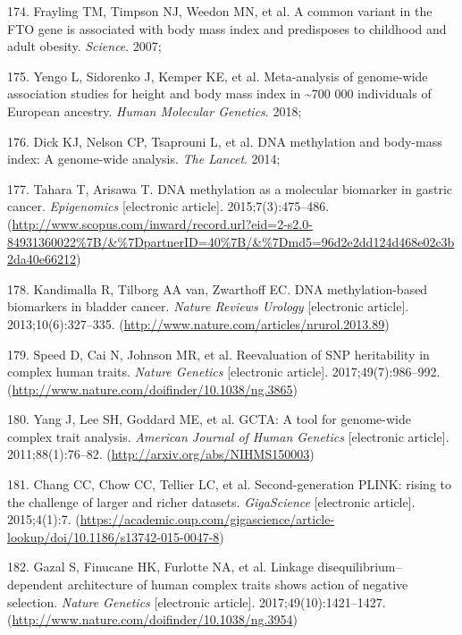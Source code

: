 \documentclass[11pt,oneside]{bristolthesis}
\newenvironment{cslreferences}%
  {}%
  {\par}
\begin{document}
\begin{cslreferences}
\leavevmode\hypertarget{ref-Frayling2007}{}%
174. Frayling TM, Timpson NJ, Weedon MN, et al. A common variant in the FTO gene is associated with body mass index and predisposes to childhood and adult obesity. \emph{Science}. 2007;

\leavevmode\hypertarget{ref-Yengo2018}{}%
175. Yengo L, Sidorenko J, Kemper KE, et al. Meta-analysis of genome-wide association studies for height and body mass index in \textasciitilde700 000 individuals of European ancestry. \emph{Human Molecular Genetics}. 2018;

\leavevmode\hypertarget{ref-Dick2014}{}%
176. Dick KJ, Nelson CP, Tsaprouni L, et al. DNA methylation and body-mass index: A genome-wide analysis. \emph{The Lancet}. 2014;

\leavevmode\hypertarget{ref-Tahara2015}{}%
177. Tahara T, Arisawa T. DNA methylation as a molecular biomarker in gastric cancer. \emph{Epigenomics} {[}electronic article{]}. 2015;7(3):475--486. (\url{http://www.scopus.com/inward/record.url?eid=2-s2.0-84931360022\%7B/\&\%7DpartnerID=40\%7B/\&\%7Dmd5=96d2e2dd124d468e02c3b2da40e66212})

\leavevmode\hypertarget{ref-Kandimalla2013}{}%
178. Kandimalla R, Tilborg AA van, Zwarthoff EC. DNA methylation-based biomarkers in bladder cancer. \emph{Nature Reviews Urology} {[}electronic article{]}. 2013;10(6):327--335. (\url{http://www.nature.com/articles/nrurol.2013.89})

\leavevmode\hypertarget{ref-Speed2017}{}%
179. Speed D, Cai N, Johnson MR, et al. Reevaluation of SNP heritability in complex human traits. \emph{Nature Genetics} {[}electronic article{]}. 2017;49(7):986--992. (\url{http://www.nature.com/doifinder/10.1038/ng.3865})

\leavevmode\hypertarget{ref-Yang2011}{}%
180. Yang J, Lee SH, Goddard ME, et al. GCTA: A tool for genome-wide complex trait analysis. \emph{American Journal of Human Genetics} {[}electronic article{]}. 2011;88(1):76--82. (\url{http://arxiv.org/abs/NIHMS150003})

\leavevmode\hypertarget{ref-Chang2015}{}%
181. Chang CC, Chow CC, Tellier LC, et al. Second-generation PLINK: rising to the challenge of larger and richer datasets. \emph{GigaScience} {[}electronic article{]}. 2015;4(1):7. (\url{https://academic.oup.com/gigascience/article-lookup/doi/10.1186/s13742-015-0047-8})

\leavevmode\hypertarget{ref-Gazal2017}{}%
182. Gazal S, Finucane HK, Furlotte NA, et al. Linkage disequilibrium--dependent architecture of human complex traits shows action of negative selection. \emph{Nature Genetics} {[}electronic article{]}. 2017;49(10):1421--1427. (\url{http://www.nature.com/doifinder/10.1038/ng.3954})


\end{cslreferences}
\end{document}
